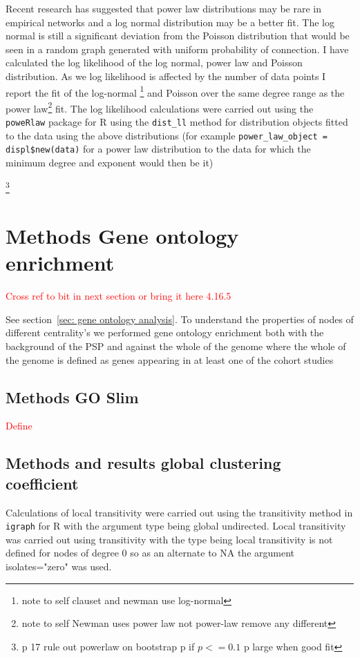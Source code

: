 Recent research has suggested that power law distributions may be rare in empirical networks and a log normal distribution may be a better fit. The log normal is still a significant deviation from the Poisson distribution that would be seen in a random graph generated with uniform probability of connection. I have calculated the log likelihood of the log normal, power law and Poisson distribution. As we log likelihood is affected by the number of data points I report the fit of the log-normal \footnote{note to self clauset and newman use log-normal} and Poisson over the same degree range as the power law\footnote{note to self Newman uses power law not power-law remove any different} fit. The log likelihood calculations were carried out using the \texttt{poweRlaw} package for R \cite{gillespie2015fitting} using the \texttt{dist\_ll} method for distribution objects fitted to the data using the above distributions (for example \texttt{power\_law\_object = displ\$new(data)} for a power law distribution to the data for which the minimum degree and exponent would then be it) 

\footnote{p 17 rule out powerlaw on bootstrap p if $p<=0.1$ p large when good fit}


\section{Methods Gene ontology enrichment}
\label{sec:Methods gene ontology centrality}
\textcolor{red}{Cross ref to bit in next section or bring it here 4.16.5}  

See section~\ref{sec: gene ontology analysis}.
To understand the properties of nodes of different centrality's we performed gene ontology enrichment both with the background of the PSP and against the whole of the genome where the whole of the genome is defined as genes appearing in at least one of the cohort studies 



\subsection{Methods GO Slim}
\textcolor{red}{Define}

\subsection{Methods and results global clustering coefficient}
Calculations of local transitivity were carried out using the transitivity method in \texttt{igraph} for R with the argument type being global undirected. Local transitivity was carried out using transitivity with the type being local transitivity is not defined for nodes of degree 0 so as an alternate to NA the argument isolates="zero" was used. 

